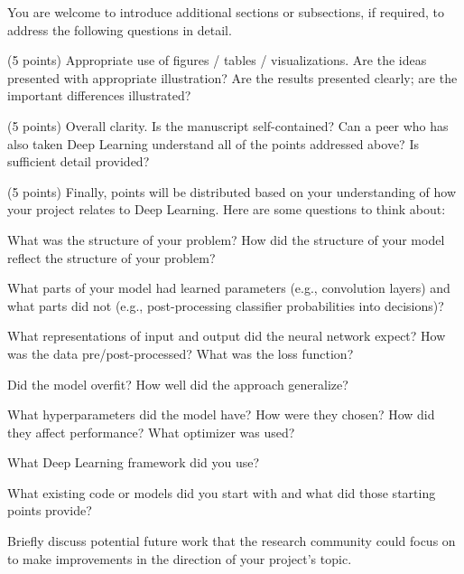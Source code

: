 \documentclass[10pt,twocolumn,letterpaper]{article}
\begin{document}
You are welcome to introduce additional sections or subsections, if required, to address the following questions in detail. 

(5 points) Appropriate use of figures / tables / visualizations. Are the ideas presented with appropriate illustration? Are the results presented clearly; are the important differences illustrated? 

(5 points) Overall clarity. Is the manuscript self-contained? Can a peer who has also taken Deep Learning understand all of the points addressed above? Is sufficient detail provided? 

(5 points) Finally, points will be distributed based on your understanding of how your project relates to Deep Learning. Here are some questions to think about: 

What was the structure of your problem? How did the structure of your model reflect the structure of your problem? 

What parts of your model had learned parameters (e.g., convolution layers) and what parts did not (e.g., post-processing classifier probabilities into decisions)? 

What representations of input and output did the neural network expect? How was the data pre/post-processed?
What was the loss function? 

Did the model overfit? How well did the approach generalize? 

What hyperparameters did the model have? How were they chosen? How did they affect performance? What optimizer was used? 

What Deep Learning framework did you use? 

What existing code or models did you start with and what did those starting points provide? 

Briefly discuss potential future work that the research community could focus on to make improvements in the direction of your project's topic.


{\small


}
\end{document}
